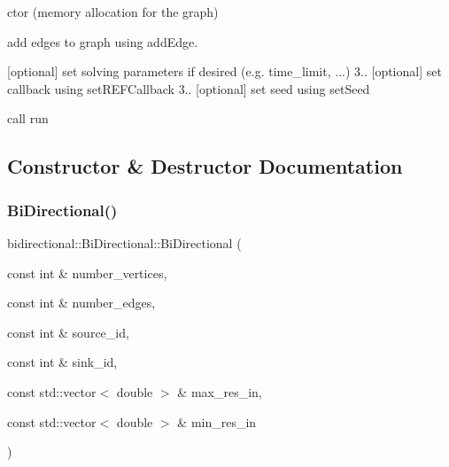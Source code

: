 \begin{DoxyEnumerate}
\item ctor (memory allocation for the graph)
\item add edges to graph using {\ttfamily add\+Edge}.
\item \mbox{[}optional\mbox{]} set solving parameters if desired (e.\+g. time\+\_\+limit, ...) 3.. \mbox{[}optional\mbox{]} set callback using {\ttfamily set\+R\+E\+F\+Callback} 3.. \mbox{[}optional\mbox{]} set seed using {\ttfamily set\+Seed}
\item call {\ttfamily run} 
\end{DoxyEnumerate}

\subsection{Constructor \& Destructor Documentation}
\mbox{\label{classbidirectional_1_1BiDirectional_aa8fc8de56198cce766bf887248136fc2}} 
\subsubsection{\texorpdfstring{Bi\+Directional()}{BiDirectional()}}
{\footnotesize\ttfamily bidirectional\+::\+Bi\+Directional\+::\+Bi\+Directional (\begin{DoxyParamCaption}\item[{const int \&}]{number\+\_\+vertices,  }\item[{const int \&}]{number\+\_\+edges,  }\item[{const int \&}]{source\+\_\+id,  }\item[{const int \&}]{sink\+\_\+id,  }\item[{const std\+::vector$<$ double $>$ \&}]{max\+\_\+res\+\_\+in,  }\item[{const std\+::vector$<$ double $>$ \&}]{min\+\_\+res\+\_\+in }\end{DoxyParamCaption})}


